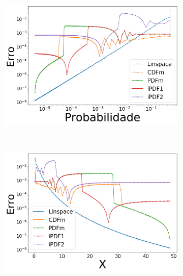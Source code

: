 \begin{figure}[H]
	\centering
	\begin{subfigure}[b]{0.45\textwidth}
		\centering 
		\includegraphics[width=\textwidth]{./figuras/error_lognormal_nearest_Probabilidade_1}
		\caption{}
		\label{fig:error_log_near_prob}
	\end{subfigure}
	\hfill
	~ %
	\begin{subfigure}[b]{0.45\textwidth}
		\centering 
		\includegraphics[width=\textwidth]{./figuras/error_lognormal_nearest_X_1}
		\caption{}
		\label{fig:error_log_near_x}
	\end{subfigure}
	~ %

\end{figure}

